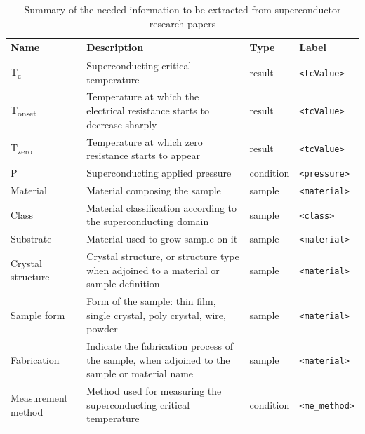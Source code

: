 \documentclass[a4paper,10pt]{article}
\begin{document}
\begin{table}[h!]
    \centering
    \begin{tabular}{ | m{6em} | m{4cm} | m{5em} | m{6em} | } 
    \hline
        Name & Description & Type & Label\\ [0.5ex] 
    \hline\hline
        T\textsubscript{c} & Superconducting critical temperature & result & \texttt{<tcValue>}\\ 
    \hline
        T\textsubscript{onset} & Temperature at which the electrical resistance starts to decrease sharply & result& \texttt{<tcValue>}\\
    \hline 
        T\textsubscript{zero} & Temperature at which zero resistance starts to appear & result & \texttt{<tcValue>}\\ 
    \hline
        P & Superconducting applied pressure & condition& \texttt{<pressure>}\\
    \hline
        Material & Material composing the sample & sample & \texttt{<material>}\\
    \hline
        Class & Material classification according to the superconducting domain & sample & \texttt{<class>}\\
    \hline  
        Substrate & Material used to grow sample on it & sample & \texttt{<material>}\\
    \hline
        Crystal structure & Crystal structure, or structure type when adjoined to a material or sample definition & sample & \texttt{<material>}\\
    \hline
        Sample form & Form of the sample: thin film, single crystal, poly crystal, wire, powder & sample & \texttt{<material>}\\
    \hline 
        Fabrication & Indicate the fabrication process of the sample, when adjoined to the sample or material name  & sample & \texttt{<material>}\\
    \hline 
        Measurement method & Method used for measuring the superconducting critical temperature & condition & \texttt{<me\_method>}\\
    \hline
    \end{tabular}
    \caption{Summary of the needed information to be extracted from superconductor research papers}
    \label{table:summary-entities-superconductor}
\end{table}
\end{document}
